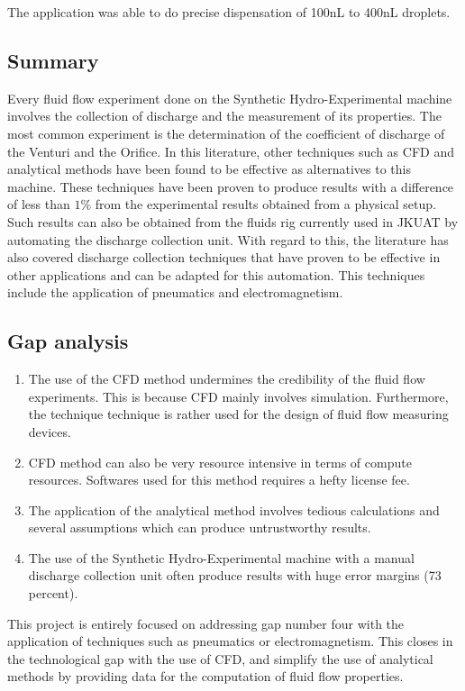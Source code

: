 The application was able to do precise dispensation of 100nL to 400nL droplets.

\subsection{Summary}

Every fluid flow experiment done on the Synthetic Hydro-Experimental machine involves the collection of discharge and the measurement of its properties. The most common experiment is the determination of the coefficient of discharge  of the Venturi and the Orifice. In this literature, other techniques such as CFD and analytical methods have been found to be effective as alternatives to this machine. These techniques have been proven to produce results with a difference of less than $1\%$  from the experimental results obtained from a physical setup. Such results can also be obtained from the fluids rig currently used in JKUAT by automating the discharge collection unit. With regard to this, the literature has also covered discharge collection techniques that have proven to be effective in other applications and can be adapted for this automation. This techniques include the application of pneumatics and electromagnetism. 

\subsection{Gap analysis}
\begin{enumerate}
    \item The use of the CFD method undermines the credibility of the fluid flow experiments. This is because CFD mainly involves simulation. Furthermore, the technique technique is rather used for the design of fluid flow measuring devices.
    \item CFD method can also be very resource intensive in terms of compute resources. Softwares used for this method requires a hefty license fee.
    \item The application of the analytical method involves tedious calculations and several assumptions which can produce untrustworthy results.
    \item The use of the Synthetic Hydro-Experimental machine with a manual discharge collection unit often produce results with huge error margins (73 percent).  
\end{enumerate}

This project is entirely focused on addressing gap number four with the application of techniques such as pneumatics or electromagnetism. This closes in the technological gap with the use of CFD, and simplify the use of analytical methods by providing data for the computation of fluid flow properties.    





